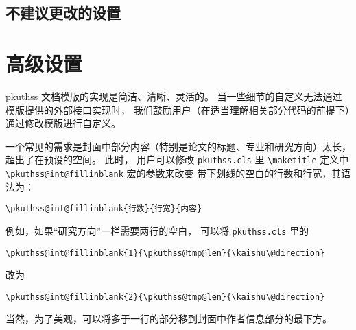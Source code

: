 		\subsection{不建议更改的设置}

	\section{高级设置}\label{sec:advanced}

	pkuthss 文档模版的实现是简洁、清晰、灵活的。
	当一些细节的自定义无法通过模版提供的外部接口实现时，
	我们鼓励用户（在适当理解相关部分代码的前提下）通过修改模版进行自定义。

	一个常见的需求是封面中部分内容（特别是论文的标题、专业和研究方向）太长，
	超出了在预设的空间。
	此时，
	用户可以修改 \verb|pkuthss.cls| 里 \verb|\maketitle| 定义中
	\verb|\pkuthss@int@fillinblank| 宏的参数来改变
	带下划线的空白的行数和行宽，其语法为：
\begin{Verbatim}[frame = single]
\pkuthss@int@fillinblank{行数}{行宽}{内容}
\end{Verbatim}
	例如，如果“研究方向”一栏需要两行的空白，
	可以将 \verb|pkuthss.cls| 里的
\begin{Verbatim}[frame = single]
\pkuthss@int@fillinblank{1}{\pkuthss@tmp@len}{\kaishu\@direction}
\end{Verbatim}
	改为
\begin{Verbatim}[frame = single]
\pkuthss@int@fillinblank{2}{\pkuthss@tmp@len}{\kaishu\@direction}
\end{Verbatim}
	当然，为了美观，可以将多于一行的部分移到封面中作者信息部分的最下方。

